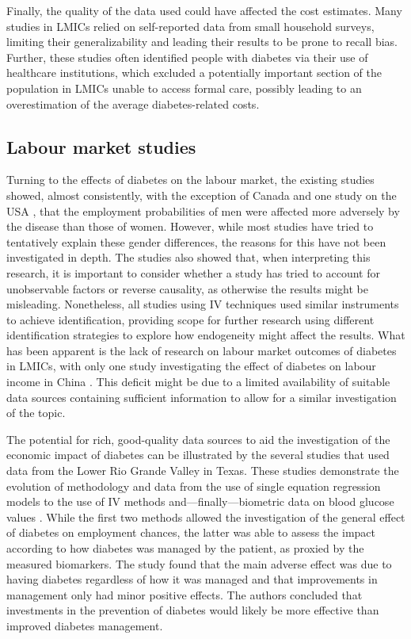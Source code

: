 Finally, the quality of the data used could have affected the cost estimates. Many studies in \acp{LMIC} relied on self-reported data from small household surveys, limiting their generalizability and leading their results to be prone to recall bias. Further, these studies often identified people with diabetes via their use of healthcare institutions, which excluded a potentially important section of the population in \acp{LMIC} unable to access formal care, possibly leading to an overestimation of the average diabetes-related costs. 

\subsection{Labour market studies}
Turning to the effects of diabetes on the labour market, the existing studies showed, almost consistently, with the exception of Canada \parencite{Latif2009} and one study on the USA \parencite{Minor2013}, that the employment probabilities of men were affected more adversely by the disease than those of women. However, while most studies have tried to tentatively explain these gender differences, the reasons for this have not been investigated in depth.  The studies also showed that, when interpreting this research, it is important to consider whether a study has tried to account for unobservable factors or reverse causality, as otherwise the results might be misleading. Nonetheless, all studies using \ac{IV} techniques used similar instruments to achieve identification, providing scope for further research using different identification strategies to explore how endogeneity might affect the results. What has been apparent is the lack of research on labour market outcomes of diabetes in \acp{LMIC}, with only one study investigating the effect of diabetes on labour income in China \parencite{Liu2014}. This deficit might be due to a limited availability of suitable data sources containing sufficient information to allow for a similar investigation of the topic.

The potential for rich, good-quality data sources to aid the investigation of the economic impact of diabetes can be illustrated by the several studies that used data from the Lower Rio Grande Valley in Texas. These studies demonstrate the evolution of methodology and data from the use of single equation regression models \parencite{Bastida2002} to the use of \ac{IV} methods \parencite{Brown2005} and---finally---biometric data on blood glucose values \parencite{BrownIII2011}. While the first two methods allowed the investigation of the general effect of diabetes on employment chances, the latter was able to assess the impact according to how diabetes was managed by the patient, as proxied by the measured biomarkers. The study found that the main adverse effect was due to having diabetes regardless of how it was managed and that improvements in management only had minor positive effects. The authors concluded that investments in the prevention of diabetes would likely be more effective than improved diabetes management.

